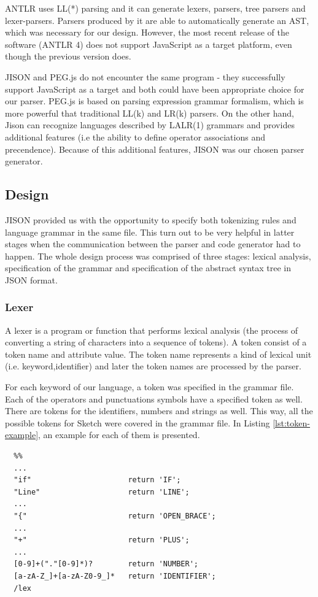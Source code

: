\documentclass{l3proj}
\begin{document}
ANTLR uses LL(*) parsing and it can generate lexers, parsers, tree parsers and lexer-parsers. Parsers produced by it are able to automatically generate an AST, which was necessary for our design. However, the most recent release of the software (ANTLR 4) does not support JavaScript as a target platform, even though the previous version does. 

JISON and PEG.js do not encounter the same program - they successfully support JavaScript as a target and both could have been appropriate choice for our parser. PEG.js is based on parsing expression grammar formalism, which is more powerful that traditional LL(k) and LR(k) parsers. On the other hand, Jison can recognize languages described by LALR(1) grammars and provides additional features (i.e the ability to define operator associations and precendence). Because of this additional features, JISON was our chosen parser generator. 


\setcounter{secnumdepth}{3}
\subsection{Design}
JISON provided us with the opportunity to specify both tokenizing rules and language grammar in the same file. This turn out to be very helpful in latter stages when the communication between the parser and code generator had to happen. The whole design process was comprised of three stages: lexical analysis, specification of the grammar and specification of the abstract syntax tree in JSON format. 

\subsubsection{Lexer}
A lexer is a program or function that performs lexical analysis (the process of converting a string of characters into a sequence of tokens).
A token consist of a token name and attribute value. The token name represents a kind of lexical unit (i.e. keyword,identifier) and later the token names are processed by the parser. 

For each keyword of  our language, a token was specified in the grammar file. Each of the operators and punctuations symbols have a specified token as well. There are tokens for the identifiers, numbers and strings as well. This way, all the possible tokens for Sketch were covered in the grammar file. In Listing \ref{lst:token-example}, an example for each of them is presented. 
\begin{center}
\lstset{
    basicstyle=\small\ttfamily,
    frame=lrtb,
  }
  

  
  \begin{lstlisting}[caption={Tokens of Sketch },label={lst:token-example}]
  %lex
  %% 
  ...
  "if"                      return 'IF';
  "Line"                    return 'LINE';
  ...
  "{"                       return 'OPEN_BRACE';
  ...
  "+"                       return 'PLUS';
  ... 
  [0-9]+("."[0-9]*)?        return 'NUMBER';
  [a-zA-Z_]+[a-zA-Z0-9_]*   return 'IDENTIFIER';
  /lex
  \end{lstlisting}
\end{center}
\end{document}
